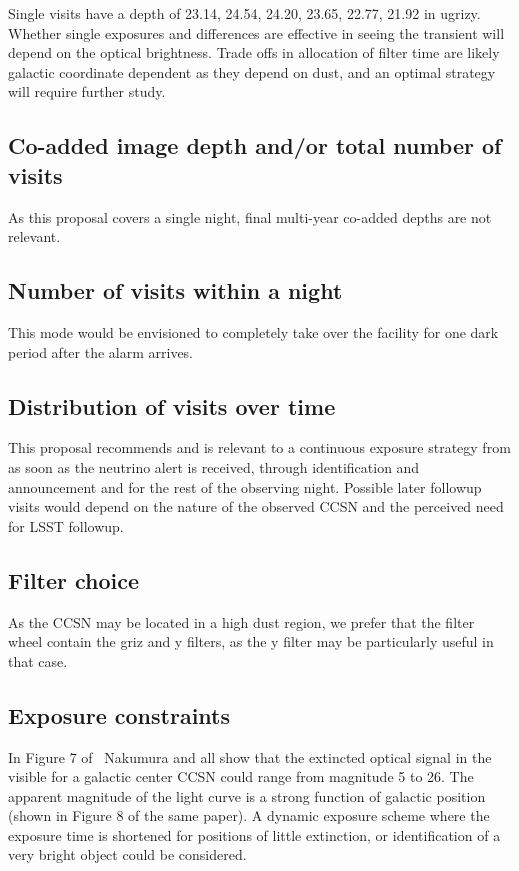 \documentclass[12pt, letterpaper]{article}
\begin{document}
Single visits have a depth of 23.14,  24.54, 24.20, 23.65, 22.77,
21.92 in ugrizy.  Whether single exposures and differences are
effective in seeing the transient will depend on the optical brightness.
Trade offs in allocation of filter time are likely galactic coordinate dependent as they depend on dust, and an optimal strategy will require further study.

\subsection{Co-added image depth and/or total number of visits}

As this proposal covers a single night, final multi-year co-added depths are not relevant.

\subsection{Number of visits within a night}

This mode would be envisioned to completely take over the facility for
one dark period after the alarm arrives.

\subsection{Distribution of visits over time}

This proposal recommends and is relevant to a continuous exposure
strategy from as soon as the neutrino alert is received, through
identification and announcement and for the rest of the observing
night.  Possible later followup visits would depend on the nature of
the observed CCSN and the perceived need for LSST followup.

\subsection{Filter choice}

As the CCSN may be located in a high dust region, we prefer that the filter wheel contain the griz and y filters, as the y filter may be particularly useful in that case.

\subsection{Exposure constraints}

In Figure 7 of~\cite{2016MNRAS.461.3296N} Nakumura and all show that
the extincted optical signal in the visible for a galactic center CCSN
could range from magnitude 5 to 26. The apparent magnitude of the
light curve is a strong function of galactic position (shown in Figure
8 of the same paper).  A dynamic exposure scheme where the exposure
time is shortened for positions of little extinction, or
identification of a very bright object could be considered.
\end{document}
